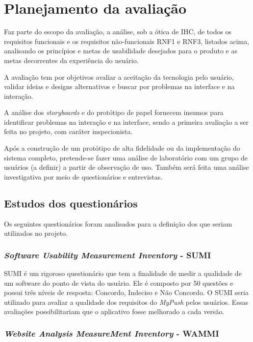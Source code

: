 \chapter{Planejamento da avaliação}

  Faz parte do escopo da avaliação, a análise, sob a ótica de IHC, de todos os requisitos funcionais e os requisitos não-funcionais
  RNF1 e RNF3, listados acima, analisando os princípios e metas de usabilidade desejados para o produto e as metas decorrentes
  da experiência do usuário.
  
  A avaliação tem por objetivos avaliar a aceitação da tecnologia pelo usuário, validar ideias e designs alternativos e buscar
  por problemas na interface e na interação.
  
  A análise dos \textit{storyboards} e do protótipo de papel fornecem insumos para identificar problemas na interação e na interface,
  sendo a primeira avaliação a ser feita no projeto, com caráter inspecionista.
  
  Após a construção de um protótipo de alta fidelidade ou da implementação do sistema completo, pretende-se fazer uma análise
  de laboratório com um grupo de usuários (a definir) a partir de observação de uso. Também será feita uma análise investigativa
  por meio de questionários e entrevistas.

  \section{Estudos dos questionários}
    
    Os seguintes questionários foram analisados para a definição dos que seriam utilizados no projeto.
    
    \subsection{\textit{Software Usability Measurement Inventory} - SUMI}
      
      SUMI é um rigoroso questionário que tem a finalidade de medir a qualidade de um software do ponto de vista do usuário.
      Ele é composto por 50 questões e possui três níveis de resposta: Concordo, Indeciso e Não Concordo. O SUMI seria utilizado
      para avaliar a qualidade dos requisitos do \textit{MyPush} pelos usuários. Essas avaliações possibilitariam que o aplicativo fosse
      melhorado a cada versão.
      
    \subsection{\textit{Website Analysis MeasureMent Inventory} - WAMMI}
    
